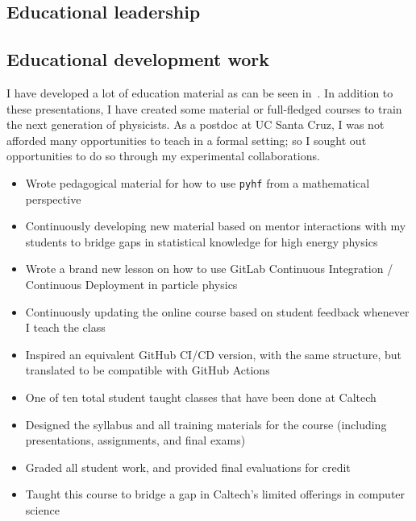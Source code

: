 \subsection{Educational leadership \noneyet}\label{ssec:educational-leadership-noneyet}
\subsection{Educational development work}\label{ssec:educational-development-work}

I have developed a lot of education material as can be seen in~. In addition to these presentations, I have created some material or full-fledged courses to train the next generation of physicists. As a postdoc at UC Santa Cruz, I was not afforded many opportunities to teach in a formal setting; so I sought out opportunities to do so through my experimental collaborations.

\begin{itemize}
	\setlength{\itemsep}{0em}
	\item Wrote pedagogical material for how to use \texttt{pyhf} from a mathematical perspective
	\item Continuously developing new material based on mentor interactions with my students to bridge gaps in statistical knowledge for high energy physics
\end{itemize}

\begin{itemize}
	\setlength{\itemsep}{0em}
	\item Wrote a brand new lesson on how to use GitLab Continuous Integration / Continuous Deployment in particle physics
	\item Continuously updating the online course based on student feedback whenever I teach the class
	\item Inspired an equivalent GitHub CI/CD version, with the same structure, but translated to be compatible with GitHub Actions
\end{itemize}

\begin{itemize}
	\setlength{\itemsep}{0em}
	\item One of ten total student taught classes that have been done at Caltech
	\item Designed the syllabus and all training materials for the course (including presentations, assignments, and final exams)
	\item Graded all student work, and provided final evaluations for credit
	\item Taught this course to bridge a gap in Caltech's limited offerings in computer science
\end{itemize}

